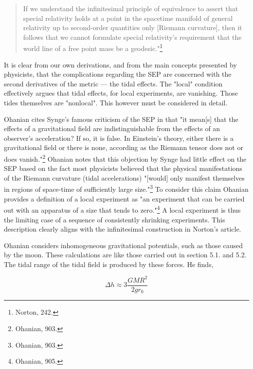 \documentclass[11pt]{article}
\begin{document}
\begin{quote}
    If we understand the infinitesimal principle of equivalence to assert that special relativity holds at a point in the spacetime manifold of general relativity up to second-order quantities only [Riemann curvature], then it follows that we cannot formulate special relativity's requirement that the world line of a free point mass be a geodesic."\footnote{Norton, 242.}
\end{quote}

It is clear from our own derivations, and from the main concepts presented by physicists, that the complications regarding the SEP are concerned with the second derivatives of the metric — the tidal effects. The "local" condition effectively argues that tidal effects, for local experiments, are vanishing. Those tides themselves are "nonlocal". This however must be considered in detail. 

Ohanian cites Synge's famous criticism of the SEP in that "it mean[s] that the effects of a gravitational field are indistinguishable from the effects of an observer's acceleration? If so, it is false. In Einstein's theory, either there is a gravitational field or there is none, according as the Riemann tensor does not or does vanish."\footnote{Ohanian, 903.} Ohanian notes that this objection by Synge had little effect on the SEP based on the fact most physicists believed that the physical manifestations of the Riemann curvature (tidal accelerations) "[would] only manifest themselves in regions of space-time of sufficiently large size."\footnote{Ohanian, 903.} To consider this claim Ohanian provides a definition of a local experiment as "an experiment that can be carried out with an apparatus of a size that tends to zero."\footnote{Ohanian, 905.} A local experiment is thus the limiting case of a sequence of consistently shrinking experiments. This description clearly aligns with the infinitesimal construction in Norton's article. 

Ohanian considers inhomogeneous gravitational potentials, such as those caused by the moon. These calculations are like those carried out in section 5.1. and 5.2. The tidal range of the tidal field is produced by these forces. He finds,

\begin{equation}
    \Delta h \approx 3 \frac{GMR^2}{2gr_0}
\end{equation}
\end{document}
